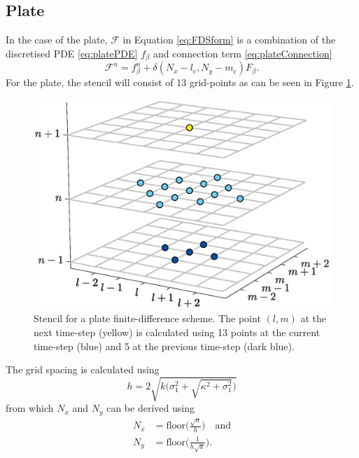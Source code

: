 \documentclass{article}
\begin{document}
\subsection{Plate}
In the case of the plate, $\mathcal{F}$ in Equation \eqref{eq:FDSform} is a combination of the discretised PDE \eqref{eq:platePDE} $f_\beta$ and connection term \eqref{eq:plateConnection}
\begin{equation}
    \mathcal{F}^n = f_\beta^n + \delta(N_x - l_{\text{c}},N_y - m_{\text{c}})F_\beta.
\end{equation}
For the plate, the stencil will consist of 13 grid-points as can be seen in Figure \ref{fig:stencil2D}.
\begin{figure}[h]
\centering
\includegraphics[width=1.0\columnwidth]{stencil2Dedit.eps}
\caption{Stencil for a plate finite-difference scheme. The point $(l,m)$ at the next time-step (yellow) is calculated using 13 points at the current time-step (blue) and 5 at the previous time-step (dark blue). \label{fig:stencil2D}}
\end{figure}
The grid spacing is calculated using \cite{Bilbao2009:ModularPercussion}
\begin{equation}\label{eq:stabilityPlate}
h = 2\sqrt{k\bigg(\sigma_1^2 + \sqrt{\kappa^2+ \sigma_1^2}\bigg)}
\end{equation}
from which $N_x$ and $N_y$ can be derived using
\begin{align}
    N_x &= \text{floor}\Bigg(\frac{\sqrt{a}}{h}\Bigg) \quad \text{and}\\
    N_y &= \text{floor}\Bigg(\frac{1}{h\sqrt{a}}\Bigg).
\end{align}
\end{document}
